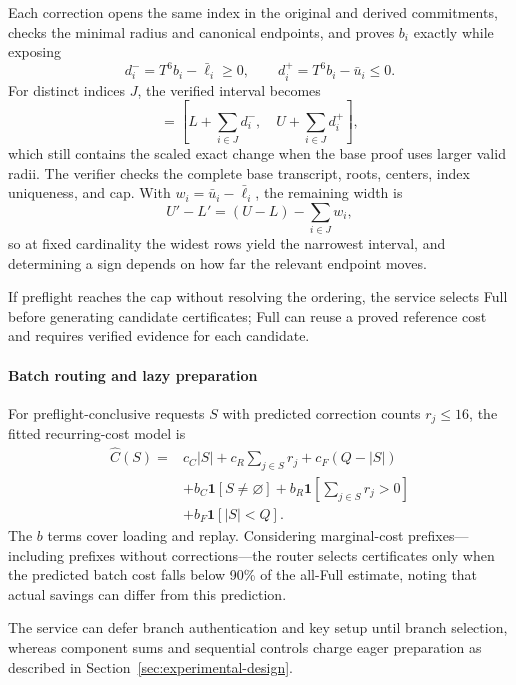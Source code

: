 \documentclass[5p,times,twocolumn]{elsarticle}
\begin{document}
Each correction opens the same index in the original and derived commitments, checks the minimal radius and canonical endpoints, and proves $b_i$ exactly while exposing
\begin{equation}
 d_i^-=T^6b_i-\bar\ell_i\geq0,
 \qquad d_i^+=T^6b_i-\bar u_i\leq0.
 \label{eq:methodology-corrections}
\end{equation}
For distinct indices $J$, the verified interval becomes
\begin{equation}
 [L',U']=\left[L+\sum_{i\in J}d_i^-,\quad
                    U+\sum_{i\in J}d_i^+\right],
 \label{eq:methodology-refined}
\end{equation}
which still contains the scaled exact change when the base proof uses larger valid radii. The verifier checks the complete base transcript, roots, centers, index uniqueness, and cap. With $w_i=\bar u_i-\bar\ell_i$, the remaining width is
\begin{equation}
 U'-L'=(U-L)-\sum_{i\in J}w_i,
 \label{eq:methodology-width}
\end{equation}
so at fixed cardinality the widest rows yield the narrowest interval, and determining a sign depends on how far the relevant endpoint moves.

If preflight reaches the cap without resolving the ordering, the service selects Full before generating candidate certificates; Full can reuse a proved reference cost and requires verified evidence for each candidate.

\paragraph{Batch routing and lazy preparation}
For preflight-conclusive requests $S$ with predicted correction counts $r_j\leq16$, the fitted recurring-cost model is
\begin{align}
 \widehat C(S)={}&c_C|S|+c_R\sum_{j\in S}r_j+c_F(Q-|S|)\nonumber\\
 &+b_C\mathbf1[S\ne\varnothing]
  +b_R\mathbf1[\textstyle\sum_{j\in S}r_j>0]\nonumber\\
 &+b_F\mathbf1[|S|<Q].
 \label{eq:methodology-routing}
\end{align}
The $b$ terms cover loading and replay. Considering marginal-cost prefixes—including prefixes without corrections—the router selects certificates only when the predicted batch cost falls below 90\% of the all-Full estimate, noting that actual savings can differ from this prediction.

The service can defer branch authentication and key setup until branch selection, whereas component sums and sequential controls charge eager preparation as described in Section~\ref{sec:experimental-design}.
\end{document}
